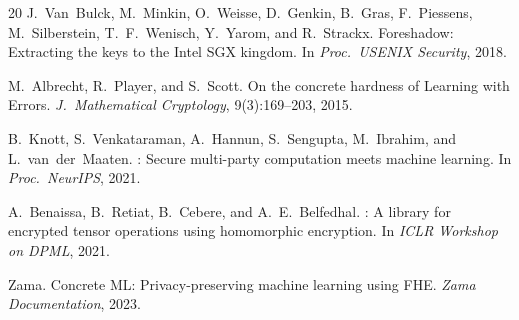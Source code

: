 \documentclass[11pt]{article}
\begin{document}
\begin{thebibliography}{20}
J.~Van~Bulck, M.~Minkin, O.~Weisse, D.~Genkin, B.~Gras, F.~Piessens, M.~Silberstein, T.~F.~Wenisch, Y.~Yarom, and R.~Strackx.
\newblock Foreshadow: Extracting the keys to the {Intel SGX} kingdom.
\newblock In \emph{Proc.\ USENIX Security}, 2018.

M.~Albrecht, R.~Player, and S.~Scott.
\newblock On the concrete hardness of {Learning with Errors}.
\newblock \emph{J.\ Mathematical Cryptology}, 9(3):169--203, 2015.

B.~Knott, S.~Venkataraman, A.~Hannun, S.~Sengupta, M.~Ibrahim, and L.~van~der~Maaten.
: Secure multi-party computation meets machine learning.
\newblock In \emph{Proc.\ NeurIPS}, 2021.

A.~Benaissa, B.~Retiat, B.~Cebere, and A.~E.~Belfedhal.
: A library for encrypted tensor operations using homomorphic encryption.
\newblock In \emph{ICLR Workshop on DPML}, 2021.

{Zama}.
\newblock Concrete {ML}: Privacy-preserving machine learning using {FHE}.
\newblock \emph{Zama Documentation}, 2023.

\end{thebibliography}
\end{document}
